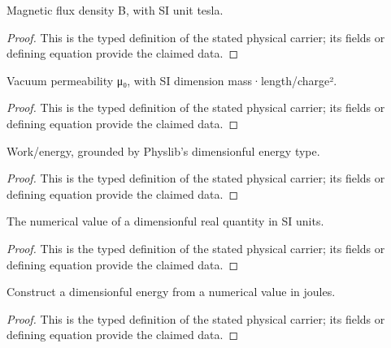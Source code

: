\begin{definition}
  \label{def:physics:IPhO_2026_3_A_3:aux007}
  Magnetic flux density B, with SI unit tesla.
\end{definition}
\begin{proof}
  This is the typed definition of the stated physical carrier; its fields or defining equation provide the claimed data.
\end{proof}

\begin{definition}
  \label{def:physics:IPhO_2026_3_A_3:aux008}
  Vacuum permeability μ₀, with SI dimension mass·length/charge².
\end{definition}
\begin{proof}
  This is the typed definition of the stated physical carrier; its fields or defining equation provide the claimed data.
\end{proof}

\begin{definition}
  \label{def:physics:IPhO_2026_3_A_3:aux009}
  Work/energy, grounded by Physlib's dimensionful energy type.
\end{definition}
\begin{proof}
  This is the typed definition of the stated physical carrier; its fields or defining equation provide the claimed data.
\end{proof}

\begin{definition}
  \label{def:physics:IPhO_2026_3_A_3:aux010}
  The numerical value of a dimensionful real quantity in SI units.
\end{definition}
\begin{proof}
  This is the typed definition of the stated physical carrier; its fields or defining equation provide the claimed data.
\end{proof}

\begin{definition}
  \label{def:physics:IPhO_2026_3_A_3:aux011}
  Construct a dimensionful energy from a numerical value in joules.
\end{definition}
\begin{proof}
  This is the typed definition of the stated physical carrier; its fields or defining equation provide the claimed data.
\end{proof}

